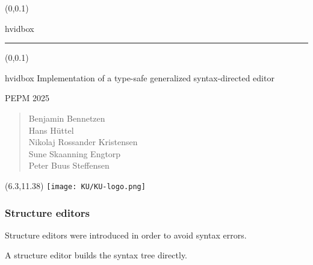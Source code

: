 \documentclass[t,24pt,aspectratio=169]{beamer}
\begin{document}
{
\begin{frame}
    \begin{textblock*}{\textwidth}(0\textwidth,0.1\textheight)
        \begin{beamercolorbox}[wd=7.8cm,ht=7.3cm,sep=0.5cm]{hvidbox}
            \fontsize{5}{10}\selectfont {}
            \noindent\textcolor{KUrod}{\rule{6.8cm}{0.4pt}}
        \end{beamercolorbox}
    \end{textblock*}
    \begin{textblock*}{\textwidth}(0\textwidth,0.1\textheight)
        \begin{beamercolorbox}[wd=7.8cm,sep=0.5cm]{hvidbox}
            \Large \textcolor{KUrod}{Implementation of a type-safe
            generalized syntax-directed editor}
            \vspace{0.5cm}
            \par
            \Large PEPM 2025
            \vspace{0.5cm}
            \par
            \normalsize \begin{verse}Benjamin Bennetzen \\
              Hans Hüttel \\
              Nikolaj Rossander Kristensen \\
              Sune Skaanning Engtorp \\
              Peter Buus Steffensen \end{verse}
        \end{beamercolorbox}
    \end{textblock*}
    \begin{textblock}{1}(6.3,11.38)
        \texttt{[image: KU/KU-logo.png]}
    \end{textblock}
\end{frame}
}

\begin{frame}[hvid]
    \frametitle{Structure editors}

    Structure editors were introduced in order to avoid syntax errors.

    A structure editor builds the syntax tree directly.
    
\end{frame}
\end{document}

